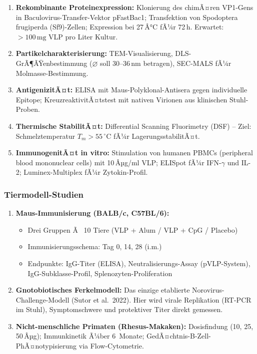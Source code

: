 ﻿\documentclass[a4paper,12pt]{article}
\theoremstyle{plain}
\theoremstyle{definition}
\theoremstyle{remark}
\begin{document}
\begin{enumerate}
  \item \textbf{Rekombinante Proteinexpression:} Klonierung des chimÃ¤ren VP1-Gens
        in Baculovirus-Transfer-Vektor pFastBac1; Transfektion von Spodoptera
        frugiperda (Sf9)-Zellen; Expression bei 27\,Â°C fÃ¼r 72\,h. Erwartet:
        $>100\,\text{mg}$ VLP pro Liter Kultur.
  \item \textbf{Partikelcharakterisierung:} TEM-Visualisierung, DLS-GrÃ¶ÃŸenbestimmung
        ($\varnothing$ soll 30--36\,nm betragen), SEC-MALS fÃ¼r Molmasse-Bestimmung.
  \item \textbf{AntigenizitÃ¤t:} ELISA mit Maus-Polyklonal-Antisera gegen individuelle
        Epitope; KreuzreaktivitÃ¤tstest mit nativen Virionen aus klinischen Stuhl-Proben.
  \item \textbf{Thermische StabilitÃ¤t:} Differential Scanning Fluorimetry (DSF)
        -- Ziel: Schmelztemperatur $T_m > 55\,^\circ\text{C}$ fÃ¼r LagerungsstabilitÃ¤t.
  \item \textbf{ImmunogenitÃ¤t in vitro:} Stimulation von humanen PBMCs (peripheral
        blood mononuclear cells) mit 10\,Âµg/ml VLP; ELISpot fÃ¼r IFN-$\gamma$ und
        IL-2; Luminex-Multiplex fÃ¼r Zytokin-Profil.
\end{enumerate}

\subsubsection{Tiermodell-Studien}

\begin{enumerate}
  \item \textbf{Maus-Immunisierung (BALB/c, C57BL/6):}
        \begin{itemize}
          \item Drei Gruppen Ã  10 Tiere (VLP + Alum / VLP + CpG / Placebo)
          \item Immunisierungsschema: Tag 0, 14, 28 (i.m.)
          \item Endpunkte: IgG-Titer (ELISA), Neutralisierungs-Assay (pVLP-System),
                IgG-Subklasse-Profil, Splenozyten-Proliferation
        \end{itemize}
  \item \textbf{Gnotobiotisches Ferkelmodell:} Das einzige etablierte
        Norovirus-Challenge-Modell (Sutor et al.\ 2022). Hier wird virale Replikation
        (RT-PCR im Stuhl), Symptomschwere und protektiver Titer direkt gemessen.
  \item \textbf{Nicht-menschliche Primaten (Rhesus-Makaken):} Dosisfindung (10, 25,
        50\,Âµg); Immunkinetik Ã¼ber 6~Monate; GedÃ¤chtnis-B-Zell-PhÃ¤notypisierung
        via Flow-Cytometrie.
\end{enumerate}
\end{document}

